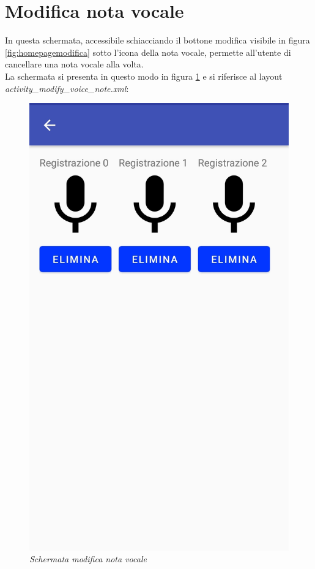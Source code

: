 \section{Modifica nota vocale}
\label{modificavocale}
In questa schermata, accessibile schiacciando il bottone modifica visibile in figura \ref{fig:homepagemodifica} sotto l'icona della nota vocale, permette all'utente di cancellare una nota vocale alla volta.
\\La schermata si presenta in questo modo in figura \ref{fig:modificavocale} e si riferisce al layout \textit{activity\_modify\_voice\_note.xml}:
\begin{figure}[!h]
    \centering
	\includegraphics[scale=0.14]{Tesi/images/ModificaVocale.jpg}
	\caption{\textit{Schermata modifica nota vocale}}
	\label{fig:modificavocale}
\end{figure}
